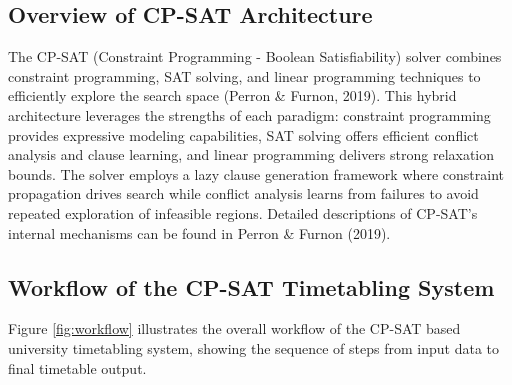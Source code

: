 \documentclass[12pt,a4paper]{article}
\begin{document}
\subsection{Overview of CP-SAT Architecture}

The CP-SAT (Constraint Programming - Boolean Satisfiability) solver combines constraint programming, SAT solving, and linear programming techniques to efficiently explore the search space (Perron \& Furnon, 2019). This hybrid architecture leverages the strengths of each paradigm: constraint programming provides expressive modeling capabilities, SAT solving offers efficient conflict analysis and clause learning, and linear programming delivers strong relaxation bounds. The solver employs a lazy clause generation framework where constraint propagation drives search while conflict analysis learns from failures to avoid repeated exploration of infeasible regions. Detailed descriptions of CP-SAT's internal mechanisms can be found in Perron \& Furnon (2019).

\subsection{Workflow of the CP-SAT Timetabling System}

Figure \ref{fig:workflow} illustrates the overall workflow of the CP-SAT based university timetabling system, showing the sequence of steps from input data to final timetable output.
\end{document}
